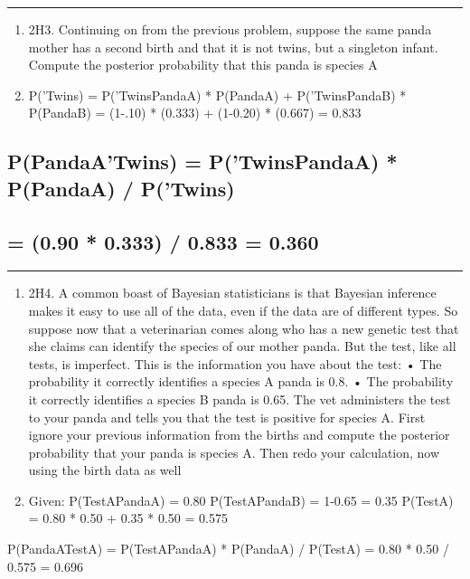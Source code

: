 \documentclass[
]{article}
\begin{document}
\begin{center}\rule{0.5\linewidth}{0.5pt}\end{center}

\begin{enumerate}
\def\labelenumi{\Alph{enumi})}
\setcounter{enumi}{16}
\item
  2H3. Continuing on from the previous problem, suppose the same panda
  mother has a second birth and that it is not twins, but a singleton
  infant. Compute the posterior probability that this panda is species A
\item
  P('Twins) = P('Twins\textbar PandaA) * P(PandaA) +
  P('Twins\textbar PandaB) * P(PandaB) = (1-.10) * (0.333) + (1-0.20) *
  (0.667) = 0.833
\end{enumerate}

\hypertarget{ppandaatwins-ptwinspandaa-ppandaa-ptwins}{%
\subsection{P(PandaA\textbar'Twins) = P('Twins\textbar PandaA) *
P(PandaA) / P('Twins)}\label{ppandaatwins-ptwinspandaa-ppandaa-ptwins}}

\hypertarget{section-2}{%
\subsection{= (0.90 * 0.333) / 0.833 = 0.360}\label{section-2}}

\begin{center}\rule{0.5\linewidth}{0.5pt}\end{center}

\begin{enumerate}
\def\labelenumi{\Alph{enumi})}
\setcounter{enumi}{16}
\item
  2H4. A common boast of Bayesian statisticians is that Bayesian
  inference makes it easy to use all of the data, even if the data are
  of different types. So suppose now that a veterinarian comes along who
  has a new genetic test that she claims can identify the species of our
  mother panda. But the test, like all tests, is imperfect. This is the
  information you have about the test: • The probability it correctly
  identifies a species A panda is 0.8. • The probability it correctly
  identifies a species B panda is 0.65. The vet administers the test to
  your panda and tells you that the test is positive for species A.
  First ignore your previous information from the births and compute the
  posterior probability that your panda is species A. Then redo your
  calculation, now using the birth data as well
\item
  Given: P(TestA\textbar PandaA) = 0.80 P(TestA\textbar PandaB) = 1-0.65
  = 0.35 P(TestA) = 0.80 * 0.50 + 0.35 * 0.50 = 0.575
\end{enumerate}

P(PandaA\textbar TestA) = P(TestA\textbar PandaA) * P(PandaA) / P(TestA)
= 0.80 * 0.50 / 0.575 = 0.696
\end{document}
